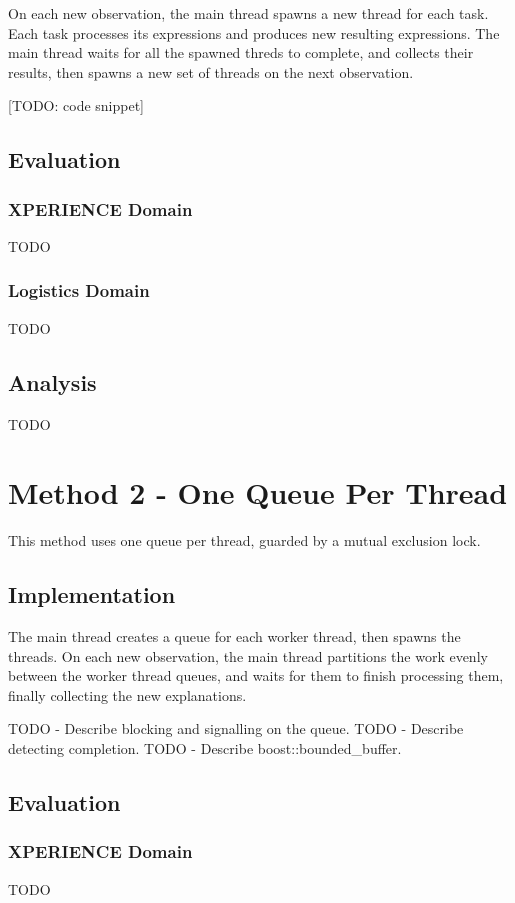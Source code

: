 \documentclass[12pt,twoside,abbrevs,msc,ai,notimes,logo,sansheadings]{infthesis}
\begin{document}
  On each new observation,  the main thread spawns a new thread for each task. Each task processes its expressions and produces new resulting expressions. The main thread waits for all the spawned threds to complete, and collects their results, then spawns a new set of threads on the next observation.
  
  [TODO: code snippet]
  
  \section{Evaluation}
  \subsection{XPERIENCE Domain}
  TODO
  \subsection{Logistics Domain}
  TODO
  \section{Analysis}
  TODO
  
  \chapter {Method 2 - One Queue Per Thread}
  
  This method uses one queue per thread, guarded by a mutual exclusion lock.
  
  \section {Implementation}
  
  The main thread creates a queue for each worker thread, then spawns the threads. On each new observation, the main thread partitions the work evenly between the worker thread queues, and waits for them to finish processing them, finally collecting the new explanations.
  
  TODO - Describe blocking and signalling on the queue.
  TODO - Describe detecting completion.
  TODO - Describe boost::bounded\_buffer.
  
  \section{Evaluation}
  \subsection{XPERIENCE Domain}
  TODO
\end{document}
